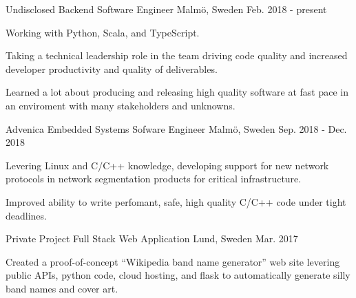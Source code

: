 


\begin{cventries}


\cventry
{Undisclosed} %
{Backend Software Engineer} %
{Malmö, Sweden} %
{Feb. 2018 - present} %
{ %
\begin{cvitems}
\item {Working with Python, Scala, and TypeScript.}
\item {Taking a technical leadership role in the team driving code quality
       and increased developer productivity and quality of deliverables.}
\item {Learned a lot about producing and releasing high quality
       software at fast pace in an enviroment with many stakeholders and
       unknowns.}
\end{cvitems}
}


\cventry
{Advenica} %
{Embedded Systems Sofware Engineer} %
{Malmö, Sweden} %
{Sep. 2018 - Dec. 2018} %
{ %
\begin{cvitems}
\item {
Levering Linux and C/C++ knowledge, developing support for new network
protocols in network segmentation products for critical infrastructure.}
\item {
Improved ability to write perfomant, safe, high quality C/C++ code under tight
deadlines.}
\end{cvitems}
}

\cventry
{Private Project} %
{Full Stack Web Application } %
{Lund, Sweden} %
{Mar. 2017 } %
{ %
\begin{cvitems}
\item {Created a proof-of-concept ``Wikipedia band name generator'' web site
levering public APIs, python code, cloud hosting, and flask to automatically
generate silly band names and cover art.}
\end{cvitems}
}


\end{cventries}
